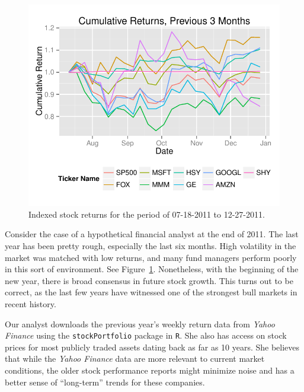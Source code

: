 \documentclass[a4paper]{article}\usepackage[]{graphicx}\usepackage[]{color}
\makeatletter
\def\maxwidth{ %
  \ifdim\Gin@nat@width>\linewidth
    \linewidth
  \else
    \Gin@nat@width
  \fi
}
\newenvironment{knitrout}{}{} %
\makeatother
\begin{document}
\begin{knitrout}
\color{fgcolor}\begin{figure}[H]
\includegraphics[width=\maxwidth]{figure/sixmonth-1} \caption[Indexed stock returns for the period of 07-18-2011 to 12-27-2011]{Indexed stock returns for the period of 07-18-2011 to 12-27-2011.\label{fig:sixmonth}}
\end{figure}


\end{knitrout}

Consider the case of a hypothetical financial analyst at the end of 2011. The last year has been pretty rough, especially the last six months. High volatility in the market was matched with low returns, and many fund managers perform poorly in this sort of environment. See Figure~\ref{fig:sixmonth}. Nonetheless, with the beginning of the new year, there is broad consensus in future stock growth. This turns out to be correct, as the last few years have witnessed one of the strongest bull markets in recent history.

Our analyst downloads the previous year's weekly return data from \textit{Yahoo Finance} using the \texttt{stockPortfolio} package in \texttt{R}. She also has access on stock prices for most publicly traded assets dating back as far as 10 years. She believes that while the \textit{Yahoo Finance} data are more relevant to current market conditions, the older stock performance reports might minimize noise and has a better sense of ``long-term'' trends for these companies.
\end{document}
